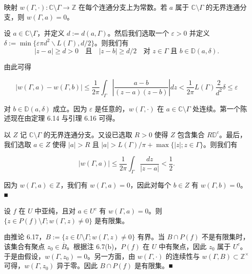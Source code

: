 \begin{corollary}

映射 $ w(\Gamma,\cdot) : \mathbb{C}\setminus\Gamma \to \mathbb{Z} $ 在每个连通分支上为常数。若 $ a $ 属于 $ \mathbb{C}\setminus\Gamma $ 的无界连通分支，则 $ w(\Gamma,a) = 0 $。

\proofhead
设 $ a \in \mathbb{C}\setminus\Gamma $，并定义 $ d := d(a,\Gamma) $。然后我们选取一个 $ \varepsilon > 0 $ 并定义 $ \delta := \min\{\varepsilon\pi d^{2}\backslash L(\Gamma),d/2\} $。则我们有
\[
|z - a| \ge d > 0 \quad \text{且}\quad |z - b| \ge d/2 \quad \text{对 } z \in \Gamma \text{ 且 } b \in \mathbb{D}(a,\delta) .
\]

由此可得

\[
|w(\Gamma,a) - w(\Gamma,b)| \le \frac{1}{2\pi}\int_{\Gamma}\left|\frac{a - b}{(z - a)(z - b)}\right|dz < \frac{1}{2\pi}L(\Gamma)\frac{2}{d^{2}}\delta \le \varepsilon
\]

对 $ b \in \mathbb{D}(a,\delta) $ 成立。因为 $ \varepsilon $ 是任意的，$ w(\Gamma,\cdot) $ 在 $ a \in \mathbb{C}\setminus\Gamma $ 处连续。第一个陈述现在由定理 6.14 与引理 6.16 可得。

以 $ Z $ 记 $ \mathbb{C}\setminus\Gamma $ 的无界连通分支。又设已选取 $ R > 0 $ 使得 $ Z $ 包含集合 $ R\mathbb{D}^{c} $。最后，我们选取 $ a \in Z $ 使得 $ |a| > R $ 且 $ |a| > L(\Gamma)/\pi + \max\{|z| ; z \in \Gamma\} $。则我们有

\[
|w(\Gamma,a)| \le \frac{1}{2\pi}\int_{\Gamma}\frac{dz}{|z - a|} < \frac{1}{2} .
\]

因为 $ w(\Gamma,a) \in \mathbb{Z} $，我们有 $ w(\Gamma,a) = 0 $，因此对每个 $ b \in Z $ 有 $ w(\Gamma,b) = 0 $。\nobreak\hspace{0.35em}■

\end{corollary}


\begin{corollary}

设 $ f $ 在 $ U $ 中亚纯，且对 $ a \in U^{c} $ 有 $ w(\Gamma,a) = 0 $。则 $ \{z \in P(f)\setminus\Gamma ; w(\Gamma,z) \ne 0\} $ 是有限集。

\proofhead
由推论 6.17，$ B := \{z \in U\setminus\Gamma ; w(\Gamma,z) \ne 0\} $ 有界。当 $ B\cap P(f) $ 不是有限集时，该集合有聚点 $ z_{0} \in \overline{B} $。根据注 6.7(b)，$ P(f) $ 在 $ U $ 中有聚点，因此 $ z_{0} $ 属于 $ U^{c} $。于是由假设，$ w(\Gamma,z_{0}) = 0 $。另一方面，由 $ w(\Gamma,\cdot) $ 的连续性与 $ w(\Gamma,B) \subset \mathbb{Z}^{\times} $ 可得，$ w(\Gamma,z_{0}) $ 异于零。因此 $ B\cap P(f) $ 是有限集。\nobreak\hspace{0.35em}■
\end{corollary}

